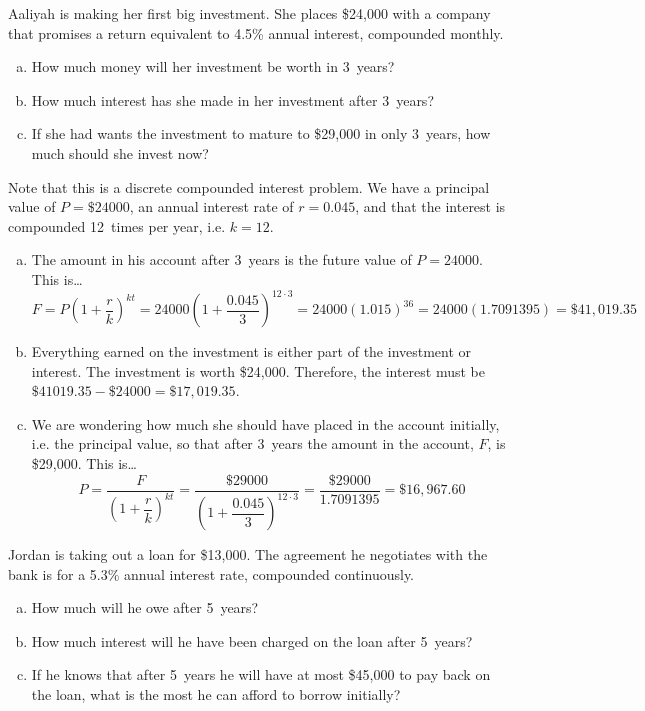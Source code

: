 \documentclass[11pt,letterpaper]{article}
\begin{document}

 Aaliyah is making her first big investment. She places \$24,000 with a company that promises a return equivalent to 4.5\% annual interest, compounded monthly.
	\begin{enumerate}[(a)]
	\item How much money will her investment be worth in 3~years?
	\item How much interest has she made in her investment after 3~years?
	\item If she had wants the investment to mature to \$29,000 in only 3~years, how much should she invest now?
	\end{enumerate} \pspace

\sol Note that this is a discrete compounded interest problem. We have a principal value of $P= \$24000$, an annual interest rate of $r= 0.045$, and that the interest is compounded 12~times per year, i.e. $k= 12$. 
\begin{enumerate}[(a)]
\item The amount in his account after 3~years is the future value of $P= 24000$. This is\dots
	\[
	F= P \left(1 + \dfrac{r}{k} \right)^{kt}= 24000 \left(1 + \dfrac{0.045}{3} \right)^{12 \cdot 3}= 24000 (1.015)^{36}= 24000 (1.7091395)= \$41,019.35
	\] \pspace

\item Everything earned on the investment is either part of the investment or interest. The investment is worth \$24,000. Therefore, the interest must be $\$41019.35 - \$24000= \$17,019.35$. \pspace

\item We are wondering how much she should have placed in the account initially, i.e. the principal value, so that after 3~years the amount in the account, $F$, is \$29,000. This is\dots
	\[
	P= \dfrac{F}{\left(1 + \dfrac{r}{k} \right)^{kt}}= \dfrac{\$29000}{\left(1 + \dfrac{0.045}{3} \right)^{12 \cdot 3}}= \dfrac{\$29000}{1.7091395}= \$16,967.60
	\]
\end{enumerate}



\newpage



 Jordan is taking out a loan for \$13,000. The agreement he negotiates with the bank is for a 5.3\% annual interest rate, compounded continuously. 
	\begin{enumerate}[(a)]
	\item How much will he owe after 5~years?
	\item How much interest will he have been charged on the loan after 5~years?
	\item If he knows that after 5~years he will have at most \$45,000 to pay back on the loan, what is the most he can afford to borrow initially? 
	\end{enumerate} \pspace
\end{document}
